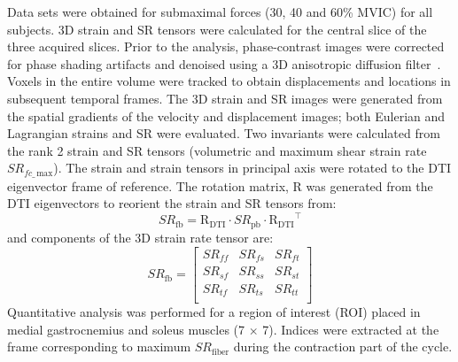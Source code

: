 Data sets were obtained for submaximal forces (30, 40 and 60\% MVIC) for all subjects. 
3D strain and SR tensors were calculated for the central slice of the three acquired slices. 
Prior to the analysis, phase-contrast images were corrected for phase shading artifacts and denoised using a 3D anisotropic diffusion filter~\cite{RNCS17}.
Voxels in the entire volume were tracked to obtain displacements and locations in subsequent temporal frames. 
The 3D strain and SR images were generated from the spatial gradients of the velocity and displacement images; both Eulerian and Lagrangian strains and SR were evaluated. 
Two invariants were calculated from the rank 2 strain and SR tensors (volumetric and maximum shear strain rate $SR_{fc\_\,\mathrm{max}}$). 
The strain and strain tensors in principal axis were rotated to the DTI eigenvector frame of reference. 
The rotation matrix, R was generated from the DTI eigenvectors to reorient the strain and SR tensors from:
\begin{equation}\label{eq: SRDTI}
SR_{\mathrm{fb}}=\mathrm{R_{DTI}}\cdot SR_{\mathrm{pb}} \cdot \mathrm{R_{DTI}}^\intercal
\end{equation}
and components of the 3D strain rate tensor are:
\begin{equation}
SR_{\mathrm{fb}} =\left[
\begin{array}{ccc}
SR_{ff} & SR_{fs} & SR_{ft} \\[4pt]
SR_{sf} & SR_{ss} & SR_{st} \\[4pt]
SR_{tf} & SR_{ts} & SR_{tt} \\
\end{array}\right]
\end{equation}
Quantitative analysis was performed for a region of interest (ROI) placed in medial gastrocnemius and soleus muscles (7 $\times$ 7).
Indices were extracted at the frame corresponding to maximum $SR_\mathrm{fiber}$ during the contraction part of the cycle.
